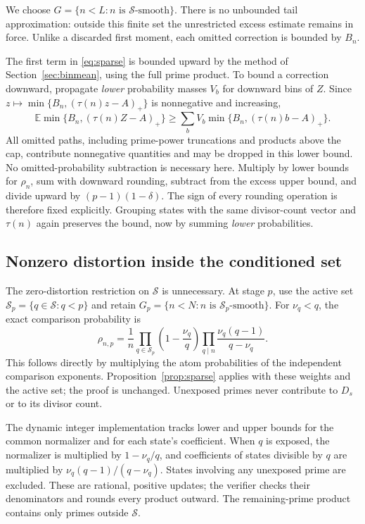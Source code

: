 \documentclass[11pt]{article}
\newcommand{\E}{\mathbb E}
\begin{document}
We choose $G=\{n<L:n\text{ is }\mathcal S\text{-smooth}\}$.
There is no unbounded tail approximation: outside this finite set the
unrestricted excess estimate remains in force. Unlike a discarded first
moment, each omitted correction is bounded by $B_n$.

The first term in \eqref{eq:sparse} is bounded upward by the method of
Section~\ref{sec:binmean}, using the full prime product. To bound a correction
downward, propagate \emph{lower} probability masses $V_b$ for downward bins
of $Z$. Since
$z\mapsto\min\{B_n,(\tau(n)z-A)_+\}$ is nonnegative and increasing,
\[
 \E\min\{B_n,(\tau(n)Z-A)_+\}
 \geq\sum_b V_b\min\{B_n,(\tau(n)b-A)_+\}.
\]
All omitted paths, including prime-power truncations and products above the
cap, contribute nonnegative quantities and may be dropped in this lower
bound. No omitted-probability subtraction is necessary here.
Multiply by lower bounds for $\rho_n$, sum with downward rounding, subtract
from the excess upper bound, and divide upward by $(p-1)(1-\delta)$.
The sign of every rounding operation is therefore fixed explicitly.
Grouping states with the same divisor-count vector and $\tau(n)$ again
preserves the bound, now by summing \emph{lower} probabilities.

\subsection{Nonzero distortion inside the conditioned set}\label{sec:dynamic}
The zero-distortion restriction on $\mathcal S$ is unnecessary. At stage
$p$, use the active set $\mathcal S_p=\{q\in\mathcal S:q<p\}$ and retain
$G_p=\{n<N:n\text{ is }\mathcal S_p\text{-smooth}\}$. For
$\nu_q<q$, the exact comparison probability is
\[
 \rho_{n,p}=\frac1n\prod_{q\in\mathcal S_p}\left(1-\frac{\nu_q}{q}\right)
       \prod_{q\mid n}\frac{\nu_q(q-1)}{q-\nu_q}.
\]
This follows directly by multiplying the atom probabilities of the
independent comparison exponents. Proposition~\ref{prop:sparse} applies
with these weights and the active set; the proof is unchanged.
Unexposed primes never contribute to $D_s$ or to its divisor count.

The dynamic integer implementation tracks lower and upper bounds for the
common normalizer and for each state's coefficient. When $q$ is exposed,
the normalizer is multiplied by $1-\nu_q/q$, and coefficients of states
divisible by $q$ are multiplied by $\nu_q(q-1)/(q-\nu_q)$. States involving
any unexposed prime are excluded. These are rational, positive updates;
the verifier checks their denominators and rounds every product outward.
The remaining-prime product contains only primes outside $\mathcal S$.
\end{document}
